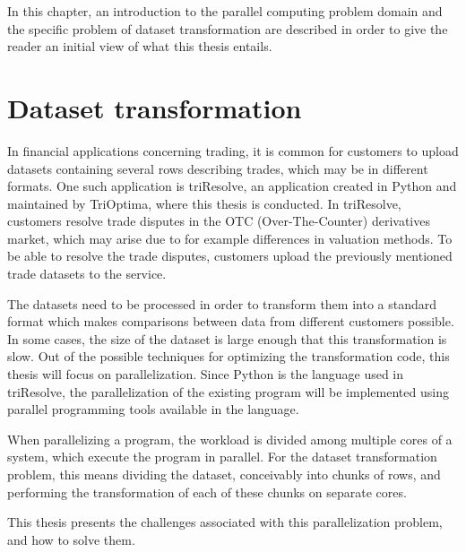 In this chapter, an introduction to the parallel computing problem domain and the specific problem of dataset transformation are
described in order to give the reader an initial view of what this thesis entails.

\section{Dataset transformation} \label{dataset_standardization}
In financial applications concerning trading, it is common for customers to upload datasets containing several rows describing trades, which may be in different formats.
One such application is triResolve, an application created in Python and maintained by TriOptima, where this thesis is conducted. 
In triResolve, customers resolve trade disputes in the OTC (Over-The-Counter) derivatives market,
which may arise due to for example differences in valuation methods.
To be able to resolve the trade disputes, customers upload the previously mentioned trade datasets to the service.

The datasets need to be processed in order to transform them into a standard format which makes comparisons between data from different customers possible.
In some cases, the size of the dataset is large enough that this transformation is slow. Out of the possible techniques for optimizing the transformation code,
this thesis will focus on parallelization. Since Python is the language used in triResolve, the parallelization of the existing program will be implemented using
parallel programming tools available in the language. 

When parallelizing a program, the workload is divided among multiple cores of a system, which execute the program in parallel.
For the dataset transformation problem, this means dividing the dataset, conceivably into chunks of rows, and performing the transformation of each of these chunks
on separate cores.

This thesis presents the challenges associated with this parallelization problem, and how to solve them.


